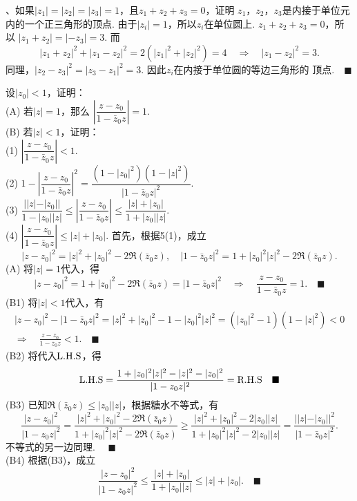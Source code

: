 \vspace{1cm}
\par{}、如果$|z_1|=|z_2|=|z_3|=1$，且$z_1+z_2+z_3=0$，证明
  $z_1$，$z_2$，$z_3$是内接于单位元内的一个正三角形的顶点.
\proof
  由于$|z_i|=1$，所以$z_i$在单位圆上. $z_1+z_2+z_3 = 0$，所以
  $|z_1+z_2| = |-z_3| = 3$. 而
  \[
    |z_1+z_2|^2+|z_1-z_2|^2 = 2(|z_1|^2+|z_2|^2) = 4
    \quad\Rightarrow\quad
    |z_1-z_2|^2 = 3.
  \]
  同理，$|z_2-z_3|^2=|z_3-z_1|^2=3$. 因此$z_i$在内接于单位圆的等边三角形的
  顶点.$\quad\blacksquare$

\vspace{1cm}
\par{} 设$|z_0|<1$，证明：\\
(A) 若$|z|=1$，那么 $\left|\dfrac{z-z_0}{1-\bar{z}_0z}\right|=1$.\\
(B) 若$|z|<1$，证明：\\
(1) $\left|\dfrac{z-z_0}{1-\bar{z}_0z}\right|<1$.\\
(2) $1-\left|\dfrac{z-z_0}{1-\bar{z}_0z}\right|^2 =
     \dfrac{(1-|z_0|^2)(1-|z|^2)}{|1-\bar{z}_0z|^2}$.\\
(3) $\dfrac{||z|-|z_0||}{1-|z_0||z|} \le
     \left|\dfrac{z-z_0}{1-\bar{z}_0z}\right| \le
      \dfrac{|z|+|z_0|}{1+|z_0||z|}$.\\
(4) $\left|\dfrac{z-z_0}{1-\bar{z}_0z}\right| \le |z|+|z_0|$.
\proof
  首先，根据5(1)，成立
  \begin{equation}
    \label{eq1}
    |z-z_0|^2 = |z|^2 + |z_0|^2 - 2\Re(\bar{z}_0z)
    ,\quad
    |1-\bar{z}_0z|^2 = 1 + |z_0|^2|z|^2 - 2\Re(\bar{z}_0z).
  \end{equation}
(A) 将$|z|=1$代入，得
  \[
    |z-z_0|^2 = 1 + |z_0|^2 - 2\Re(\bar{z}_0z) = |1-\bar{z}_0z|^2
    \quad\Rightarrow\quad \frac{z-z_0}{1-\bar{z}_0z} = 1. \quad\blacksquare
  \]
(B1) 将$|z|<1$代入，有
  \begin{gather*}
    |z-z_0|^2 - |1-\bar{z}_0z|^2 = |z|^2 + |z_0|^2 - 1 - |z_0|^2|z|^2
     = (|z_0|^2-1)(1-|z|^2) < 0 \\
    \Rightarrow\quad
    \frac{z-z_0}{1-\bar{z}_0z} < 1.\quad\blacksquare
  \end{gather*}
(B2) 将代入$\text{L.H.S}$，得
  \[
    \text{L.H.S} = \frac{1+|z_0|^2|z|^2 - |z|^2 - |z_0|^2}{|1-z_0z|^2} = \text{R.H.S}
    \quad\blacksquare
  \]
(B3) 已知$\Re(\bar{z}_0z) \le |z_0||z|$，根据糖水不等式，有
  \[
    \frac{|z-z_0|^2}{|1-z_0z|^2} =
    \frac{|z|^2+|z_0|^2-2\Re(\bar{z}_0z)}{1+|z_0|^2|z|^2-2\Re(\bar{z}_0z)}
    \ge \frac{|z|^2+|z_0|^2 - 2|z_0||z|}{1+|z_0|^2|z|^2-2|z_0||z|} =
    \frac{||z|-|z_0||^2}{|1-\bar{z}_0z|^2}.
  \]
  不等式的另一边同理. $\quad\blacksquare$\\
(B4) 根据(B3)，成立
  \[
    \frac{|z-z_0|^2}{|1-z_0z|^2} \le \frac{|z|+|z_0|}{1+|z_0||z|} \le |z|+|z_0|.
    \quad\blacksquare
  \]


